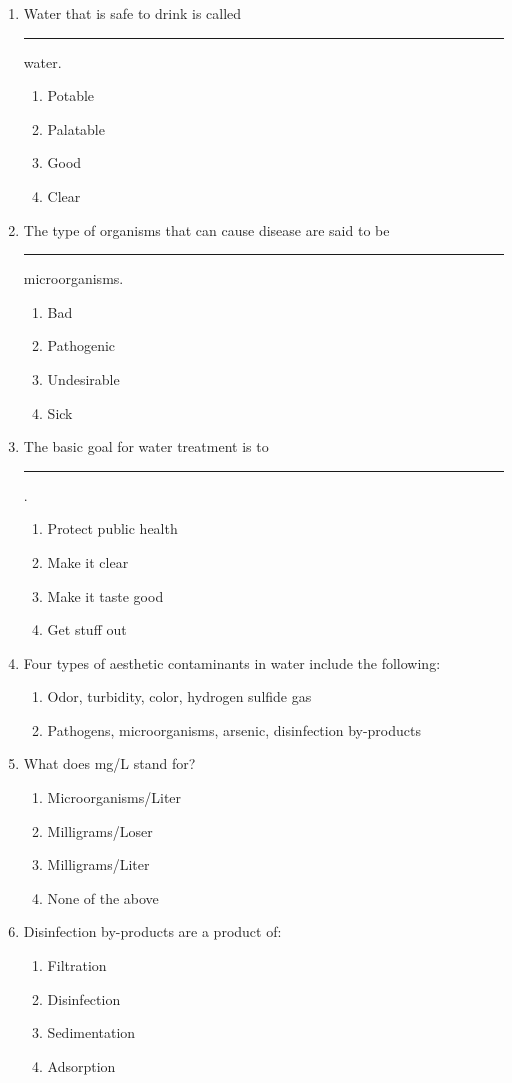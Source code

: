 \begin{enumerate}
\item Water that is safe to drink is called \rule{1cm}{0.5pt}  water.
\begin{enumerate}
\item Potable
\item Palatable
\item Good
\item Clear
\end{enumerate}

\item The type of organisms that can cause disease are said to be \rule{1cm}{0.5pt} microorganisms.
\begin{enumerate}
\item Bad
\item Pathogenic
\item Undesirable
\item Sick
\end{enumerate}

\item The basic goal for water treatment is to \rule{1cm}{0.5pt}.
\begin{enumerate}
\item Protect public health
\item Make it clear
\item Make it taste good
\item Get stuff out
\end{enumerate}

\item Four types of aesthetic contaminants in water include the following:
\begin{enumerate}
\item Odor, turbidity, color, hydrogen sulfide gas
\item Pathogens, microorganisms, arsenic, disinfection by-products
\end{enumerate}

\item What does mg/L stand for?
\begin{enumerate}
\item Microorganisms/Liter
\item Milligrams/Loser
\item Milligrams/Liter
\item None of the above
\end{enumerate}

\item Disinfection by-products are a product of:
\begin{enumerate}
\item Filtration
\item Disinfection
\item Sedimentation
\item Adsorption
\end{enumerate}


\end{enumerate}
